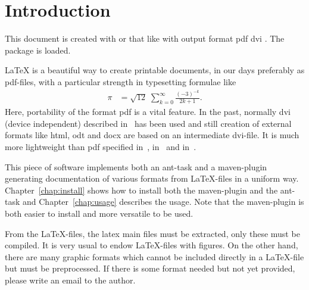\chapter{Introduction}%

This document is created with \lualatex{} or that like 
with output format 
\ifpdf%
pdf%
\else
dvi%
\fi.
The package  
is  loaded. 

\LaTeX{} is a beautiful way to create printable documents, 
in our days preferably as \gls{pdf}-files, 
with a particular strength in typesetting formulae like
%
%
\begin{align}
\pi & = \sqrt{12}\;\sum^\infty_{k=0} \frac{(-3)^{-k}}{2k+1}. %
\end{align}
%
Here, portability of the format \gls{pdf} is a vital feature. 
In the past, normally \gls{dvi} (device independent)
described in~\cite{DviF} has been used 
and still creation of external formats like \gls{html}, 
\gls{odt} and \gls{docx} are based on an intermediate \gls{dvi}-file.
It is much more lightweight than pdf specified in~\cite{Pdf1}, in~\cite{Pdf2}
and in~\cite{Pdf3}.

This piece of software implements both an ant-task and a maven-plugin 
generating documentation of various formats from \LaTeX-files 
in a uniform way. 
Chapter~\ref{chap:install} shows how to install both the maven-plugin 
and the ant-task 
and Chapter~\ref{chap:usage} describes the usage. 
Note that the maven-plugin is both easier to install 
and more versatile to be used. 

From the \LaTeX-files, the latex main files must be extracted, 
only these must be compiled. 
It is very usual to endow \LaTeX-files with figures. 
On the other hand, there are many graphic formats 
which cannot be included directly in a \LaTeX-file 
but must be preprocessed. 
If there is some format needed but not yet provided, 
please write an email to the author. 

